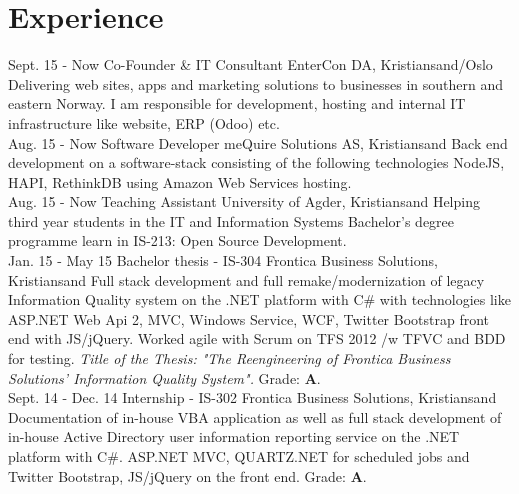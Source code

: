 \documentclass[]{cv-class}
\begin{document}
\section{Experience}
\begin{entrylist}
  \entry
    {Sept. 15 - Now}
    {Co-Founder \& IT Consultant}
    {EnterCon DA, Kristiansand/Oslo}
    {Delivering web sites, apps and marketing solutions to businesses
    in southern and eastern Norway. I am responsible for development,
    hosting and internal IT infrastructure like website, ERP (Odoo) etc.\\}
  \entry
    {Aug. 15 - Now}
    {Software Developer}
    {meQuire Solutions AS, Kristiansand}
    {Back end development on a software-stack consisting of the following 
    technologies NodeJS, HAPI, RethinkDB using Amazon Web Services hosting.\\}
  \entry
    {Aug. 15 - Now}
    {Teaching Assistant}
    {University of Agder, Kristiansand}
    {Helping third year students in the IT and Information Systems Bachelor's degree programme
    learn in IS-213: Open Source Development.\\}
  \entry
    {Jan. 15 - May 15}
    {Bachelor thesis - IS-304}
    {Frontica Business Solutions, Kristiansand}
    {Full stack development and full remake/modernization of legacy Information Quality system
    on the .NET platform with C\# with technologies like ASP.NET Web Api 2,
    MVC, Windows Service, WCF, 
    Twitter Bootstrap front end with JS/jQuery. Worked agile with Scrum on TFS 2012 /w TFVC
    and BDD for testing.
    \emph{Title of the Thesis: 
    "The Reengineering of Frontica Business Solutions' Information Quality System".} 
    Grade: \textbf{A}.\\}
  \entry
    {Sept. 14 - Dec. 14}
    {Internship - IS-302}
    {Frontica Business Solutions, Kristiansand}
    {Documentation of in-house VBA application as well as full stack development of 
    in-house Active Directory
    user information reporting service on the .NET platform with C\#. ASP.NET MVC, 
    QUARTZ.NET for scheduled jobs
    and Twitter Bootstrap, JS/jQuery on the front end. Grade: \textbf{A}.\\}
\end{entrylist}
\end{document}
